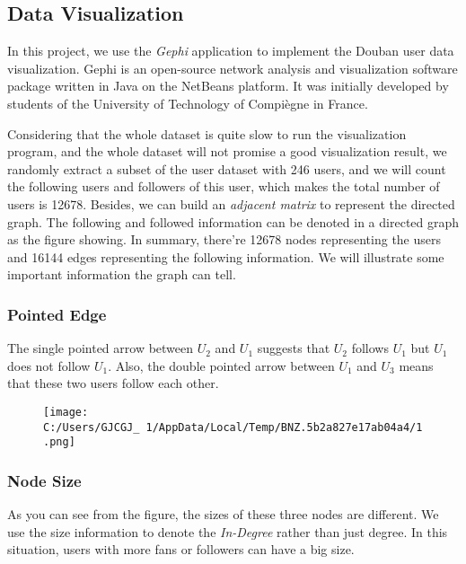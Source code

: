 \documentclass[]{article}
\date{}
\begin{document}
\hypertarget{header-n151}{%
\subsection{Data Visualization}\label{header-n151}}

In this project, we use the \emph{Gephi} application to implement the
Douban user data visualization. Gephi is an open-source network analysis
and visualization software package written in Java on the NetBeans
platform. It was initially developed by students of the University of
Technology of Compiègne in France.

Considering that the whole dataset is quite slow to run the
visualization program, and the whole dataset will not promise a good
visualization result, we randomly extract a subset of the user dataset
with 246 users, and we will count the following users and followers of
this user, which makes the total number of users is 12678. Besides, we
can build an \emph{adjacent matrix} to represent the directed graph. The
following and followed information can be denoted in a directed graph as
the figure showing. In summary, there're 12678 nodes representing the
users and 16144 edges representing the following information. We will
illustrate some important information the graph can tell.

\hypertarget{header-n157}{%
\subsubsection{Pointed Edge}\label{header-n157}}

The single pointed arrow between \(U_2\) and \(U_1\) suggests that
\(U_2\) follows \(U_1\) but \(U_1\) does not follow \(U_1\). Also, the
double pointed arrow between \(U_1\) and \(U_3\) means that these two
users follow each other.\\

\begin{figure}
\centering
\texttt{[image: C:/Users/GJCGJ\_~1/AppData/Local/Temp/BNZ.5b2a827e17ab04a4/1.png]}
\caption{}
\end{figure}

\hypertarget{header-n164}{%
\subsubsection{Node Size}\label{header-n164}}

As you can see from the figure, the sizes of these three nodes are
different. We use the size information to denote the \emph{In-Degree}
rather than just degree. In this situation, users with more fans or
followers can have a big size.
\end{document}
